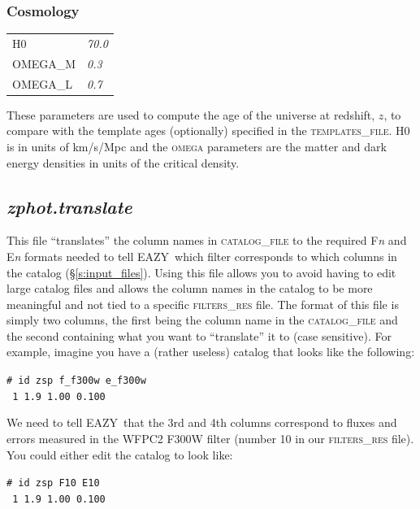 \documentclass[11pt]{article}
\newcommand{\eazy}{\textsc{EAZY}}
\begin{document}
\subsubsection{Cosmology}
\begin{tabular}{ll}
 \textsc{H0               } & \textsl{    70.0               } \\
 \textsc{OMEGA\_M         } & \textsl{     0.3               } \\
 \textsc{OMEGA\_L       } & \textsl{        0.7               }
\end{tabular}

\vspace*{0.25cm} These parameters are used to compute the age of the universe
at redshift, $z$, to compare with the template ages (optionally) specified in
the \textsc{templates\_file}.  \textsc{H0} is in units of km/s/Mpc and the
\textsc{omega} parameters are the matter and dark energy densities in units of
the critical density.

    \subsection{\textit{zphot.translate} \label{s:translate}}

	This file ``translates'' the column names in
	\textsc{catalog\_file} to the required F\textsl{n} and
	E\textsl{n} formats needed to tell \eazy\ which filter
	corresponds to which columns in the catalog
	(\S\ref{s:input_files}).  Using this file allows you to
	avoid having to edit large catalog files and allows the
	column names in the catalog to be more meaningful and
	not tied to a specific \textsc{filters\_res} file.  The
	format of this file is simply two columns, the first
	being the column name in the \textsc{catalog\_file} and
	the second containing what you want to ``translate'' it
	to (case sensitive).  For example, imagine you have a
	(rather useless) catalog that looks like the following:

\texttt{\# id   zsp    f\_f300w   e\_f300w }\\
\texttt{\   1   1.9     1.00       0.100 }

We need to tell \eazy\ that the 3rd and 4th columns
correspond to fluxes and errors measured in the WFPC2 F300W
filter (number 10 in our \textsc{filters\_res} file).  You
could either edit the catalog to look like:

\texttt{\# id   zsp      F10        E10 }\\
\texttt{\   1   1.9     1.00       0.100 }
\end{document}
